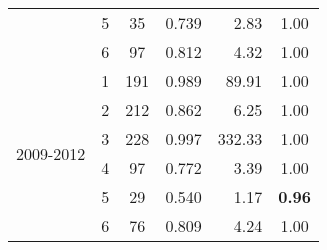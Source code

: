 \begin{table}
\begin{tabular}{rrcrrr}
    \multicolumn{1}{c}{} & \multicolumn{1}{c}{5} & \multicolumn{1}{c}{35} & \multicolumn{1}{c}{0.739 } & \multicolumn{1}{r}{2.83 } & \multicolumn{1}{c}{1.00 } \\
    \multicolumn{1}{c}{} & \multicolumn{1}{c}{6} & \multicolumn{1}{c}{97} & \multicolumn{1}{c}{0.812} & \multicolumn{1}{r}{4.32 } & \multicolumn{1}{c}{1.00 } \\\midrule
    \multicolumn{1}{c}{\multirow{6}[2]{*}{\begin{sideways}2009-2012\end{sideways}}} & \multicolumn{1}{c}{1} & \multicolumn{1}{c}{191} & \multicolumn{1}{c}{0.989 } & \multicolumn{1}{r}{89.91 } & \multicolumn{1}{c}{1.00 } \\
    \multicolumn{1}{c}{} & \multicolumn{1}{c}{2} & \multicolumn{1}{c}{212} & \multicolumn{1}{c}{0.862 } & \multicolumn{1}{r}{6.25 } & \multicolumn{1}{c}{1.00 } \\
    \multicolumn{1}{c}{} & \multicolumn{1}{c}{3} & \multicolumn{1}{c}{228} & \multicolumn{1}{c}{0.997 } & \multicolumn{1}{r}{332.33 } & \multicolumn{1}{c}{1.00 } \\
    \multicolumn{1}{c}{} & \multicolumn{1}{c}{4} & \multicolumn{1}{c}{97} & \multicolumn{1}{c}{0.772 } & \multicolumn{1}{r}{3.39 } & \multicolumn{1}{c}{1.00 } \\
    \multicolumn{1}{c}{} & \multicolumn{1}{c}{5} & \multicolumn{1}{c}{29} & \multicolumn{1}{c}{0.540 } & \multicolumn{1}{r}{1.17 } & \multicolumn{1}{c}{\textbf{0.96}} \\
    \multicolumn{1}{c}{} & \multicolumn{1}{c}{6} & \multicolumn{1}{c}{76} & \multicolumn{1}{c}{0.809} & \multicolumn{1}{r}{4.24 } & \multicolumn{1}{c}{1.00 } \\
    \bottomrule
    \end{tabular}%
  \label{tab:ANCSWPHPA}%
\end{table}%
